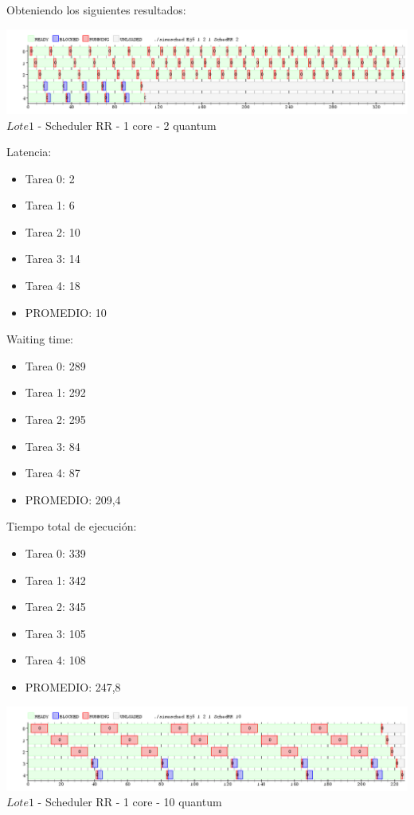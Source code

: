 Obteniendo los siguientes resultados:

\begin{center}

    
	\includegraphics[width=450pt]{./Test/ej5_2.png}
	{$Lote 1$ - Scheduler RR - 1 core - 2 quantum}	
 
\end{center}

\indent Latencia:\
\begin{itemize}
 \item Tarea 0: 2
 \item Tarea 1: 6
 \item Tarea 2: 10
 \item Tarea 3: 14
 \item Tarea 4: 18
 \item PROMEDIO: 10
\end{itemize}
\indent Waiting time:\
\begin{itemize}
 \item Tarea 0: 289
 \item Tarea 1: 292
 \item Tarea 2: 295
 \item Tarea 3: 84
 \item Tarea 4: 87
 \item PROMEDIO: 209,4
\end{itemize}
\indent Tiempo total de ejecuci\'{o}n:\
\begin{itemize}
 \item Tarea 0: 339
 \item Tarea 1: 342
 \item Tarea 2: 345
 \item Tarea 3: 105
 \item Tarea 4: 108
 \item PROMEDIO: 247,8
\end{itemize}

\begin{center}
  	\includegraphics[width=450pt]{./Test/ej5_10.png}
	  {$Lote 1$ - Scheduler RR - 1 core - 10 quantum}	
\end{center}

